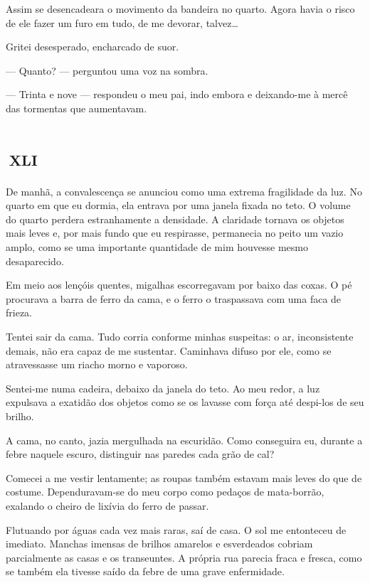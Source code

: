 Assim se desencadeara o movimento da bandeira no quarto. Agora havia o risco de ele fazer um furo em tudo, de me devorar, talvez\ldots{}

Gritei desesperado, encharcado de suor.

--- Quanto? --- perguntou uma voz na sombra.

--- Trinta e nove --- respondeu o meu pai, indo embora e deixando-me à mercê das tormentas que aumentavam.


\chapter*{\small{}\,\Large\centering\textsc{xli}\,\small{}}

De manhã, a convalescença se anunciou como uma extrema fragilidade da luz. No quarto em que eu dormia, ela entrava por uma janela fixada no teto. O volume do quarto perdera estranhamente a densidade. A claridade tornava os objetos mais leves e, por mais fundo que eu respirasse, permanecia no peito um vazio amplo, como se uma importante quantidade de mim houvesse mesmo desaparecido.

Em meio aos lençóis quentes, migalhas escorregavam por baixo das coxas. O pé procurava a barra de ferro da cama, e o ferro o traspassava com uma faca de frieza.

Tentei sair da cama. Tudo corria conforme minhas suspeitas: o ar, inconsistente demais, não era capaz de me sustentar. Caminhava difuso por ele, como se atravessasse um riacho morno e vaporoso.

Sentei-me numa cadeira, debaixo da janela do teto. Ao meu redor, a luz expulsava a exatidão dos objetos como se os lavasse com força até despi-los de seu brilho.

A cama, no canto, jazia mergulhada na escuridão. Como conseguira eu, durante a febre naquele escuro, distinguir nas paredes cada grão de cal?

Comecei a me vestir lentamente; as roupas também estavam mais leves do que de costume. Dependuravam-se do meu corpo como pedaços de mata-borrão, exalando o cheiro de lixívia do ferro de passar.

Flutuando por águas cada vez mais raras, saí de casa. O sol me entonteceu de imediato. Manchas imensas de brilhos amarelos e esverdeados cobriam parcialmente as casas e os transeuntes. A própria rua parecia fraca e fresca, como se também ela tivesse saído da febre de uma grave enfermidade.

